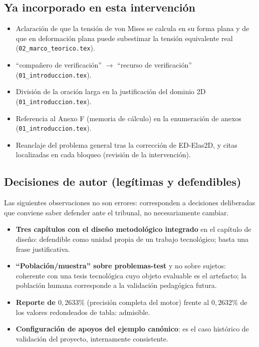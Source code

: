 \documentclass[11pt,a4paper]{article}
\newcommand{\fileref}[1]{\texttt{\small #1}}
\begin{document}
\subsection*{Ya incorporado en esta intervención}

\begin{itemize}[nosep]
  \item Aclaración de que la tensión de von Mises se calcula en su forma plana y de que en deformación plana puede subestimar la tensión equivalente real (\fileref{02\_marco\_teorico.tex}).
  \item ``compañero de verificación'' $\to$ ``recurso de verificación'' (\fileref{01\_introduccion.tex}).
  \item División de la oración larga en la justificación del dominio 2D (\fileref{01\_introduccion.tex}).
  \item Referencia al Anexo F (memoria de cálculo) en la enumeración de anexos (\fileref{01\_introduccion.tex}).
  \item Reanclaje del problema general tras la corrección de ED-Elas2D, y citas localizadas en cada bloqueo (revisión de la intervención).
\end{itemize}

\subsection*{Decisiones de autor (legítimas y defendibles)}

Las siguientes observaciones no son errores: corresponden a decisiones deliberadas que conviene saber
defender ante el tribunal, no necesariamente cambiar.

\begin{itemize}[nosep]
  \item \textbf{Tres capítulos con el diseño metodológico integrado} en el capítulo de diseño: defendible como unidad propia de un trabajo tecnológico; basta una frase justificativa.
  \item \textbf{``Población/muestra'' sobre problemas-test} y no sobre sujetos: coherente con una tesis tecnológica cuyo objeto evaluable es el artefacto; la población humana corresponde a la validación pedagógica futura.
  \item \textbf{Reporte de $0{,}2633\%$} (precisión completa del motor) frente al $0{,}2632\%$ de los valores redondeados de tabla: admisible.
  \item \textbf{Configuración de apoyos del ejemplo canónico}: es el caso histórico de validación del proyecto, internamente consistente.
\end{itemize}
\end{document}
